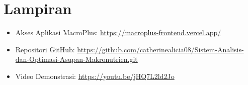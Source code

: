 \documentclass[conference]{IEEEtran}
\begin{document}



\section*{Lampiran}

\begin{itemize}
    \item Akses Aplikasi MacroPlus:
    \url{https://macroplus-frontend.vercel.app/}
    
    \item Repositori GitHub:
    \url{https://github.com/catherinealicia08/Sistem-Analisis-dan-Optimasi-Asupan-Makronutrien.git}
    
    \item Video Demonstrasi:
    \url{https://youtu.be/jHQ7L2ld2Jo}
\end{itemize}
\end{document}
